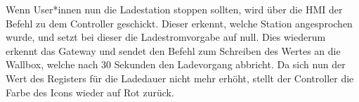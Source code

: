 Wenn User*innen nun die Ladestation stoppen sollten, wird über die HMI der Befehl zu dem Controller geschickt. Dieser erkennt, welche Station angesprochen wurde, und setzt bei dieser die Ladestromvorgabe auf null. Dies wiederum erkennt das Gateway und sendet den Befehl zum Schreiben des Wertes an die Wallbox, welche nach 30 Sekunden den Ladevorgang abbricht. Da sich nun der Wert des Registers für die Ladedauer nicht mehr erhöht, stellt der Controller die Farbe des Icons wieder auf Rot zurück. 